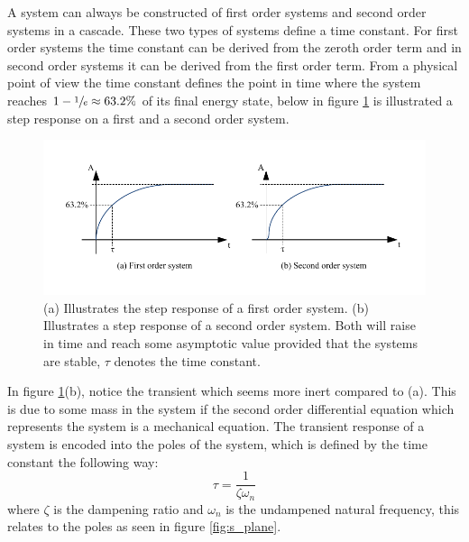 A system can always be constructed of first order systems and second order systems in a cascade. These two types of systems define a time constant. For first order systems the time constant can be derived from the zeroth order term and in second order systems it can be derived from the first order term. From a physical point of view the time constant defines the point in time where the system reaches $1 - \sfrac{1}{e} \approx 63.2\%$ of its final energy state, below in figure \ref{fig:energy_systems} is illustrated a step response on a first and a second order system.
\begin{figure}[htb]
	\begin{center}
	\includegraphics[scale=1,trim=0 0 0 0]{graphics/energy_systems.pdf} %
	\caption{(a) Illustrates the step response of a first order system. (b) Illustrates a step response of a second order system. Both will raise in time and reach some asymptotic value provided that the systems are stable, $\tau$ denotes the time constant.}
	\label{fig:energy_systems}			%
	\end{center}
\end{figure}
\newpage
In figure \ref{fig:energy_systems}(b), notice the transient which seems more inert compared to (a). This is due to some mass in the system if the second order differential equation which represents the system is a mechanical equation. The transient response of a system is encoded into the poles of the system, which is defined by the time constant the following way:
\begin{equation}
	\tau = \frac{1}{\zeta\omega_{n}}\label{eq:time_constant}
\end{equation}
where $\zeta$ is the dampening ratio and $\omega_{n}$ is the undampened natural frequency, this relates to the poles as seen in figure \ref{fig:s_plane}.
